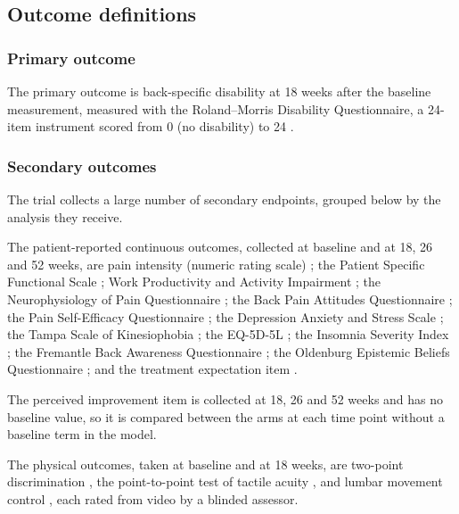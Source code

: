 \documentclass[11pt,a4paper]{article}
\begin{document}
\subsection{Outcome definitions}
\label{sec:outcomes}

\subsubsection{Primary outcome}

The primary outcome is back-specific disability at 18 weeks after the
baseline measurement, measured with the Roland--Morris Disability
Questionnaire, a 24-item instrument scored from 0 (no disability) to 24
\citep{roland2000, chiarotto2016}.

\subsubsection{Secondary outcomes}
\label{sec:secondary}

The trial collects a large number of secondary endpoints, grouped below by
the analysis they receive.

The patient-reported continuous outcomes, collected at baseline and at 18,
26 and 52 weeks, are pain intensity (numeric rating scale)
\citep{hawker2011}; the Patient Specific Functional Scale
\citep{heldmann2015}; Work Productivity and Activity Impairment
\citep{reilly1993}; the Neurophysiology of Pain Questionnaire
\citep{richter2019}; the Back Pain Attitudes Questionnaire
\citep{darlow2014}; the Pain Self-Efficacy Questionnaire \citep{mangels2009};
the Depression Anxiety and Stress Scale \citep{nilges2015}; the Tampa Scale
of Kinesiophobia \citep{rusu2014}; the EQ-5D-5L \citep{herdman2011}; the
Insomnia Severity Index \citep{dieck2018}; the Fremantle Back Awareness
Questionnaire \citep{ehrenbrusthoff2018}; the Oldenburg Epistemic Beliefs
Questionnaire \citep{berding2018}; and the treatment
expectation item \citep{barth2019}.

The perceived improvement item is collected at 18, 26 and 52 weeks and has no
baseline value, so it is compared between the arms at each time point without
a baseline term in the model.

The physical outcomes, taken at baseline and at 18 weeks, are two-point
discrimination \citep{catley2013}, the point-to-point test of tactile
acuity \citep{adamczyk2016}, and lumbar movement control
\citep{luomajoki2007, luomajoki2008}, each rated from video by a blinded
assessor.
\end{document}
